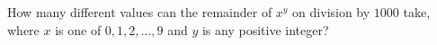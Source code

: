 How many different values can the remainder of $x^y$ on division by $1000$ take, where $x$ is one of $0,1,2,\dots,9$ and $y$ is any positive integer?
